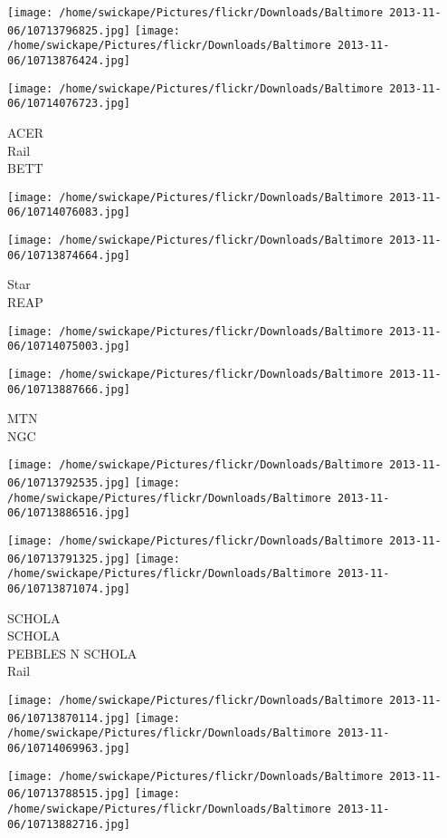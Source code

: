\documentclass[10pt,letterpaper]{article}
\begin{document}
\texttt{[image: /home/swickape/Pictures/flickr/Downloads/Baltimore 2013-11-06/10713796825.jpg]}
\texttt{[image: /home/swickape/Pictures/flickr/Downloads/Baltimore 2013-11-06/10713876424.jpg]}

\vspace{0.25in}
\texttt{[image: /home/swickape/Pictures/flickr/Downloads/Baltimore 2013-11-06/10714076723.jpg]}

ACER\\
Rail\\
BETT
\pagebreak

\texttt{[image: /home/swickape/Pictures/flickr/Downloads/Baltimore 2013-11-06/10714076083.jpg]}

\vspace{0.25in}
\texttt{[image: /home/swickape/Pictures/flickr/Downloads/Baltimore 2013-11-06/10713874664.jpg]}

Star\\
REAP
\pagebreak

\texttt{[image: /home/swickape/Pictures/flickr/Downloads/Baltimore 2013-11-06/10714075003.jpg]}

\vspace{0.25in}
\texttt{[image: /home/swickape/Pictures/flickr/Downloads/Baltimore 2013-11-06/10713887666.jpg]}

MTN\\
NGC
\pagebreak

\texttt{[image: /home/swickape/Pictures/flickr/Downloads/Baltimore 2013-11-06/10713792535.jpg]}
\texttt{[image: /home/swickape/Pictures/flickr/Downloads/Baltimore 2013-11-06/10713886516.jpg]}

\texttt{[image: /home/swickape/Pictures/flickr/Downloads/Baltimore 2013-11-06/10713791325.jpg]}
\texttt{[image: /home/swickape/Pictures/flickr/Downloads/Baltimore 2013-11-06/10713871074.jpg]}

SCHOLA\\
SCHOLA\\
PEBBLES N SCHOLA\\
Rail
\pagebreak

\texttt{[image: /home/swickape/Pictures/flickr/Downloads/Baltimore 2013-11-06/10713870114.jpg]}
\texttt{[image: /home/swickape/Pictures/flickr/Downloads/Baltimore 2013-11-06/10714069963.jpg]}

\texttt{[image: /home/swickape/Pictures/flickr/Downloads/Baltimore 2013-11-06/10713788515.jpg]}
\texttt{[image: /home/swickape/Pictures/flickr/Downloads/Baltimore 2013-11-06/10713882716.jpg]}
\end{document}
